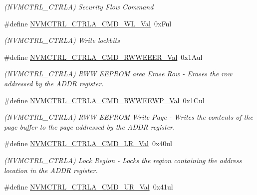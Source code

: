 \begin{DoxyCompactItemize}
\begin{DoxyCompactList}\small\item\em (N\+V\+M\+C\+T\+R\+L\+\_\+\+C\+T\+R\+LA) Security Flow Command \end{DoxyCompactList}\item 
\#define \mbox{\hyperlink{group___s_a_m_d21___n_v_m_c_t_r_l_ga16cd33731304aa0ed2db58be2f6fe599}{N\+V\+M\+C\+T\+R\+L\+\_\+\+C\+T\+R\+L\+A\+\_\+\+C\+M\+D\+\_\+\+W\+L\+\_\+\+Val}}~0x\+Ful
\begin{DoxyCompactList}\small\item\em (N\+V\+M\+C\+T\+R\+L\+\_\+\+C\+T\+R\+LA) Write lockbits \end{DoxyCompactList}\item 
\#define \mbox{\hyperlink{group___s_a_m_d21___n_v_m_c_t_r_l_ga0e738a1a6d1d0bce5caad7fce29f2e18}{N\+V\+M\+C\+T\+R\+L\+\_\+\+C\+T\+R\+L\+A\+\_\+\+C\+M\+D\+\_\+\+R\+W\+W\+E\+E\+E\+R\+\_\+\+Val}}~0x1\+Aul
\begin{DoxyCompactList}\small\item\em (N\+V\+M\+C\+T\+R\+L\+\_\+\+C\+T\+R\+LA) R\+WW E\+E\+P\+R\+OM area Erase Row -\/ Erases the row addressed by the A\+D\+DR register. \end{DoxyCompactList}\item 
\#define \mbox{\hyperlink{group___s_a_m_d21___n_v_m_c_t_r_l_ga6cbdf6599c74676de89836531389b7f1}{N\+V\+M\+C\+T\+R\+L\+\_\+\+C\+T\+R\+L\+A\+\_\+\+C\+M\+D\+\_\+\+R\+W\+W\+E\+E\+W\+P\+\_\+\+Val}}~0x1\+Cul
\begin{DoxyCompactList}\small\item\em (N\+V\+M\+C\+T\+R\+L\+\_\+\+C\+T\+R\+LA) R\+WW E\+E\+P\+R\+OM Write Page -\/ Writes the contents of the page buffer to the page addressed by the A\+D\+DR register. \end{DoxyCompactList}\item 
\#define \mbox{\hyperlink{group___s_a_m_d21___n_v_m_c_t_r_l_ga30ddc4581bb1d3ba0a5dfebff3025ae6}{N\+V\+M\+C\+T\+R\+L\+\_\+\+C\+T\+R\+L\+A\+\_\+\+C\+M\+D\+\_\+\+L\+R\+\_\+\+Val}}~0x40ul
\begin{DoxyCompactList}\small\item\em (N\+V\+M\+C\+T\+R\+L\+\_\+\+C\+T\+R\+LA) Lock Region -\/ Locks the region containing the address location in the A\+D\+DR register. \end{DoxyCompactList}\item 
\#define \mbox{\hyperlink{group___s_a_m_d21___n_v_m_c_t_r_l_ga594434a1450c942a3a1b8938d7f8ee50}{N\+V\+M\+C\+T\+R\+L\+\_\+\+C\+T\+R\+L\+A\+\_\+\+C\+M\+D\+\_\+\+U\+R\+\_\+\+Val}}~0x41ul

\end{DoxyCompactItemize}
